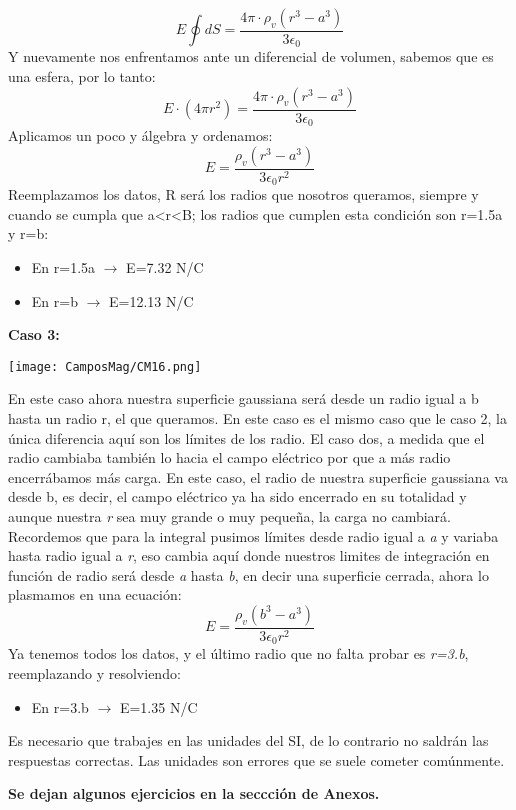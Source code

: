 \documentclass[
	11pt, %
	fleqn, %
	a4paper, %
]{LegrandOrangeBook}
\begin{document}
\begin{example}
\begin{displaymath}
E\oint dS = \frac{4\pi\cdot\rho_v\left(r^3-a^3\right)}{3\epsilon_0}
\end{displaymath}
Y nuevamente nos enfrentamos ante un diferencial de volumen, sabemos que es una esfera, por lo tanto:
\begin{displaymath}
E\cdot(4\pi r^2) = \frac{4\pi\cdot\rho_v\left(r^3-a^3\right)}{3\epsilon_0}
\end{displaymath}
Aplicamos un poco y álgebra y ordenamos:
\begin{displaymath}
E=\frac{\rho_v\left(r^3-a^3\right)}{3\epsilon_0 r^2}
\end{displaymath}
Reemplazamos los datos, R será los radios que nosotros queramos, siempre y cuando se cumpla que a<r<B; los radios que cumplen esta condición son r=1.5a y r=b:
\begin{itemize}
\item En r=1.5a $\rightarrow$ E=7.32 N/C
\item En r=b $\rightarrow$ E=12.13 N/C\\
\end{itemize}
\textbf{Caso 3:}
\begin{center}
\texttt{[image: CamposMag/CM16.png]}
\end{center}
En este caso ahora nuestra superficie gaussiana será desde un radio igual a b hasta un radio r, el que queramos. En este caso es el mismo caso que le caso 2, la única diferencia aquí son los límites de los radio. El caso dos, a medida que el radio cambiaba también lo hacia el campo eléctrico por que a más radio encerrábamos más carga. En este caso, el radio de nuestra superficie gaussiana va desde b, es decir, el campo eléctrico ya ha sido encerrado en su totalidad y aunque nuestra \textit{r} sea muy grande o muy pequeña, la carga no cambiará. Recordemos que para la integral pusimos límites desde radio igual a \textit{a} y variaba hasta radio igual a  \textit{r}, eso cambia aquí donde nuestros limites de integración en función de radio será desde \textit{a} hasta \textit{b}, en decir una superficie cerrada, ahora lo plasmamos en una ecuación:
\begin{displaymath}
E=\frac{\rho_v\left(b^3-a^3\right)}{3\epsilon_0 r^2}
\end{displaymath}
Ya tenemos todos los datos, y el último radio que no falta probar es \textit{r=3.b}, reemplazando y resolviendo:
\begin{itemize}
\item En r=3.b $\rightarrow$ E=1.35 N/C
\end{itemize}

\end{example}
\begin{remark}
Es necesario que trabajes en las unidades del SI, de lo contrario no saldrán las respuestas correctas. Las unidades son errores que se suele cometer comúnmente.
\end{remark}
\textbf{Se dejan algunos ejercicios en la seccción de Anexos.}\\
\end{document}
